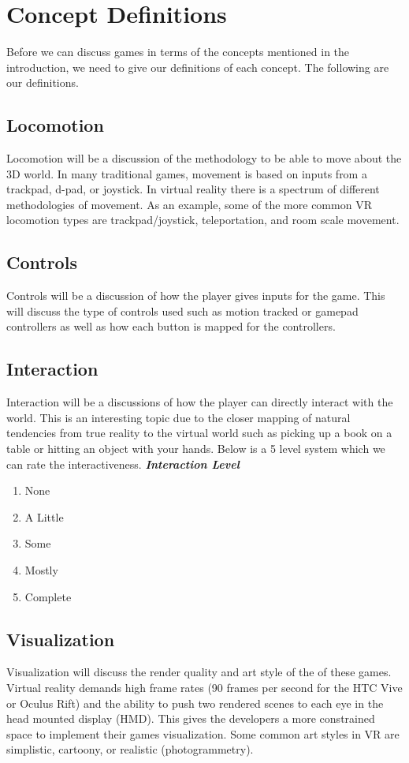 \documentclass[journal]{IEEEtran}
\begin{document}
\section{Concept Definitions}
Before we can discuss games in terms of the concepts mentioned in the introduction, we need to give our definitions of each concept. The following are our definitions. 


\subsection{Locomotion}
Locomotion will be a discussion of the methodology to be able to move about the 3D world. In many traditional games, movement is based on inputs from a trackpad, d-pad, or joystick.  In virtual reality there is a spectrum of different methodologies of movement. As an example, some of the more common VR locomotion types are trackpad/joystick, teleportation, and room scale movement.

\subsection{Controls}
Controls will be a discussion of how the player gives inputs for the game. This will discuss the type of controls used such as motion tracked or gamepad controllers as well as how each button is mapped for the controllers. 

\subsection{Interaction}
Interaction will be a discussions of how the player can directly interact with the world. This is an interesting topic due to the closer mapping of natural tendencies from true reality to the virtual world such as picking up a book on a table or hitting an object with your hands. Below is a 5 level system which we can rate the interactiveness. \newline\newline
\textit{\textbf{Interaction Level}}
   \begin{enumerate}
   	\item None
   	\item A Little
   	\item Some
   	\item Mostly
   	\item Complete
   \end{enumerate}
   
\subsection{Visualization}
Visualization  will discuss the render quality and art style of the of these games. Virtual reality demands high frame rates (90 frames per second for the HTC Vive or Oculus Rift) and the ability to push two rendered scenes to each eye in the head mounted display (HMD). This gives the developers a more constrained space to implement their games  visualization. Some common art styles in VR are simplistic, cartoony, or realistic (photogrammetry). 
\end{document}
